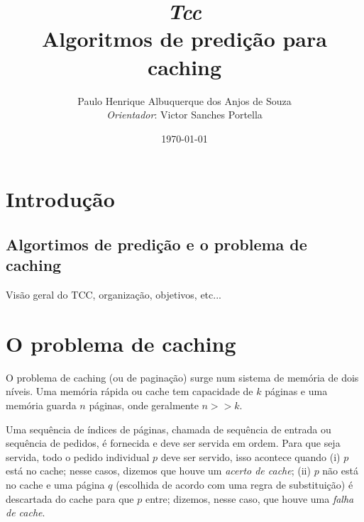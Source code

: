 \documentclass[a4paper,oneside,reqno,12pt]{amsart}
\begin{document}
\baselineskip
\frenchspacing

% 
% 

\setcounter{page}{1}

\title{%
{\small\sl Tcc}\\
\smallskip
Algoritmos de predição para caching}

\author{%
Paulo Henrique Albuquerque dos Anjos de Souza \\
{\tiny\emph{Orientador}:  Victor Sanches Portella}
}
%
%

\date{\today}
\maketitle

\pagestyle{plain}
\footskip=25pt

\vspace{-20pt}


\section{Introdução}

\subsection{Algortimos de predição e o problema de caching}

Visão geral do TCC, organização, objetivos, etc...

\section{O problema de caching}

O problema de caching (ou de paginação) surge num sistema de memória de dois níveis. Uma memória rápida ou cache tem capacidade de $k$ páginas e uma memória guarda $n$ páginas, onde geralmente $n >> k$.

Uma sequência de índices de páginas, chamada de sequência de entrada ou sequência de pedidos, é fornecida e deve ser servida em ordem. Para que seja servida, todo o pedido individual $p$ deve ser servido, isso acontece quando (i) $p$ está no cache; nesse casos, dizemos que houve um \textit{acerto de cache}; (ii) $p$ não está no cache e uma página $q$ (escolhida de acordo com uma regra de substituição) é descartada do cache para que $p$ entre; dizemos, nesse caso, que houve uma \textit{falha de cache}.
\end{document}
